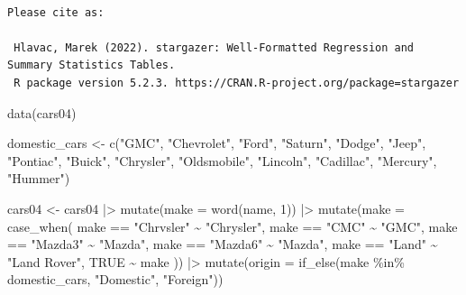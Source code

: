 \documentclass[
  letterpaper,
]{book}
\newenvironment{Shaded}{\begin{snugshade}}{\end{snugshade}}
\newcommand{\AttributeTok}[1]{\textcolor[rgb]{0.40,0.45,0.13}{#1}}
\newcommand{\ConstantTok}[1]{\textcolor[rgb]{0.56,0.35,0.01}{#1}}
\newcommand{\DecValTok}[1]{\textcolor[rgb]{0.68,0.00,0.00}{#1}}
\newcommand{\FunctionTok}[1]{\textcolor[rgb]{0.28,0.35,0.67}{#1}}
\newcommand{\NormalTok}[1]{\textcolor[rgb]{0.00,0.23,0.31}{#1}}
\newcommand{\OtherTok}[1]{\textcolor[rgb]{0.00,0.23,0.31}{#1}}
\newcommand{\SpecialCharTok}[1]{\textcolor[rgb]{0.37,0.37,0.37}{#1}}
\newcommand{\StringTok}[1]{\textcolor[rgb]{0.13,0.47,0.30}{#1}}
\begin{document}
\begin{verbatim}

Please cite as: 

 Hlavac, Marek (2022). stargazer: Well-Formatted Regression and Summary Statistics Tables.
 R package version 5.2.3. https://CRAN.R-project.org/package=stargazer 
\end{verbatim}

\begin{Shaded}
\begin{Highlighting}[]
\FunctionTok{data}\NormalTok{(cars04)}
\end{Highlighting}
\end{Shaded}

\begin{Shaded}
\begin{Highlighting}[]
\NormalTok{domestic\_cars }\OtherTok{\textless{}{-}} \FunctionTok{c}\NormalTok{(}\StringTok{"GMC"}\NormalTok{,}
                   \StringTok{"Chevrolet"}\NormalTok{, }
                   \StringTok{"Ford"}\NormalTok{, }
                   \StringTok{"Saturn"}\NormalTok{, }
                   \StringTok{"Dodge"}\NormalTok{, }
                   \StringTok{"Jeep"}\NormalTok{, }
                   \StringTok{"Pontiac"}\NormalTok{, }
                   \StringTok{"Buick"}\NormalTok{,}
                   \StringTok{"Chrysler"}\NormalTok{,}
                   \StringTok{"Oldsmobile"}\NormalTok{, }
                   \StringTok{"Lincoln"}\NormalTok{,}
                   \StringTok{"Cadillac"}\NormalTok{, }
                   \StringTok{"Mercury"}\NormalTok{, }
                   \StringTok{"Hummer"}\NormalTok{)}

\NormalTok{cars04 }\OtherTok{\textless{}{-}}\NormalTok{ cars04 }\SpecialCharTok{|\textgreater{}} 
  \FunctionTok{mutate}\NormalTok{(}\AttributeTok{make =} \FunctionTok{word}\NormalTok{(name, }\DecValTok{1}\NormalTok{)) }\SpecialCharTok{|\textgreater{}} 
  \FunctionTok{mutate}\NormalTok{(}\AttributeTok{make =} \FunctionTok{case\_when}\NormalTok{(}
\NormalTok{    make }\SpecialCharTok{==} \StringTok{"Chrvsler"} \SpecialCharTok{\textasciitilde{}} \StringTok{"Chrysler"}\NormalTok{,}
\NormalTok{    make }\SpecialCharTok{==} \StringTok{"CMC"} \SpecialCharTok{\textasciitilde{}} \StringTok{"GMC"}\NormalTok{,}
\NormalTok{    make }\SpecialCharTok{==} \StringTok{"Mazda3"} \SpecialCharTok{\textasciitilde{}} \StringTok{"Mazda"}\NormalTok{,}
\NormalTok{    make }\SpecialCharTok{==} \StringTok{"Mazda6"} \SpecialCharTok{\textasciitilde{}} \StringTok{"Mazda"}\NormalTok{,}
\NormalTok{    make }\SpecialCharTok{==} \StringTok{"Land"} \SpecialCharTok{\textasciitilde{}} \StringTok{"Land Rover"}\NormalTok{,}
    \ConstantTok{TRUE} \SpecialCharTok{\textasciitilde{}}\NormalTok{ make}
\NormalTok{  )) }\SpecialCharTok{|\textgreater{}} 
  \FunctionTok{mutate}\NormalTok{(}\AttributeTok{origin =} \FunctionTok{if\_else}\NormalTok{(make }\SpecialCharTok{\%in\%}\NormalTok{ domestic\_cars, }\StringTok{"Domestic"}\NormalTok{, }\StringTok{"Foreign"}\NormalTok{))}


\end{Highlighting}
\end{Shaded}
\end{document}
